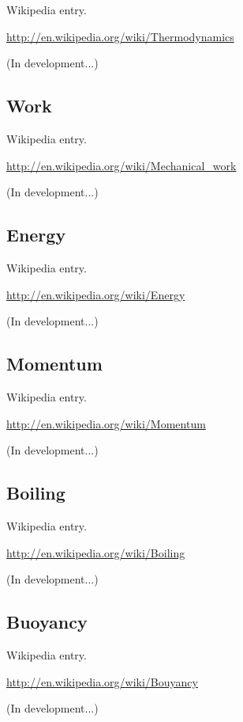 \documentclass[12pt,oneside]{book}
\begin{document}
Wikipedia entry.

\href{http://en.wikipedia.org/wiki/Thermodynamics}{http://en.wikipedia.org/wiki/Thermodynamics}

(In development...)

\subsection[Work]{Work}

Wikipedia entry.

\href{http://en.wikipedia.org/wiki/Mechanical_work}{http://en.wikipedia.org/wiki/Mechanical\_work}

(In development...)

\subsection[Energy]{Energy}

Wikipedia entry.

\href{http://en.wikipedia.org/wiki/Energy}{http://en.wikipedia.org/wiki/Energy}

(In development...)

\subsection[Momentum]{Momentum}

Wikipedia entry.

\href{http://en.wikipedia.org/wiki/Momentum}{http://en.wikipedia.org/wiki/Momentum}

(In development...)

\subsection[Boiling]{Boiling}

Wikipedia entry.

\href{http://en.wikipedia.org/wiki/Boiling}{http://en.wikipedia.org/wiki/Boiling}

(In development...)

\subsection[Buoyancy]{Buoyancy}

Wikipedia entry.

\href{http://en.wikipedia.org/wiki/Bouyancy}{http://en.wikipedia.org/wiki/Bouyancy}

(In development...)
\end{document}
